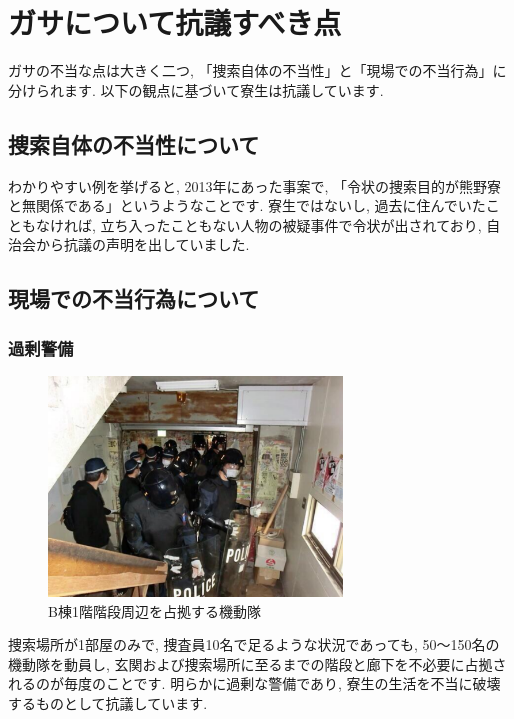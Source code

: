 \section{ガサについて抗議すべき点}
\label{gasa_kogi}
	ガサの不当な点は大きく二つ, 「捜索自体の不当性」と「現場での不当行為」に分けられます. 以下の観点に基づいて寮生は抗議しています.

		\subsection{捜索自体の不当性について}
		 わかりやすい例を挙げると, 2013年にあった事案で, 「令状の捜索目的が熊野寮と無関係である」というようなことです. 寮生ではないし, 過去に住んでいたこともなければ, 立ち入ったこともない人物の被疑事件で令状が出されており, 自治会から抗議の声明を出していました.


    
    

		\subsection{現場での不当行為について}

			

			\subsubsection{過剰警備}

			\begin{figure}
				\centering
				\includegraphics[width=7.8cm]{gazo/gasa.pdf}
				\caption*{\small{B棟1階階段周辺を占拠する機動隊}}
			\end{figure}

			捜索場所が1部屋のみで, 捜査員10名で足るような状況であっても, 50〜150名の機動隊を動員し, 玄関および捜索場所に至るまでの階段と廊下を不必要に占拠されるのが毎度のことです. 明らかに過剰な警備であり, 寮生の生活を不当に破壊するものとして抗議しています.
			
